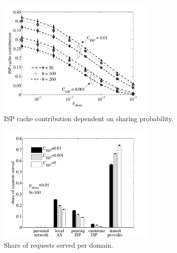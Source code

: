 \begin{figure}[tb]
  \centering
  \includegraphics[width=0.7\textwidth]{hierarchical/simulative/figures/ISPcontrib}
  \caption{ISP cache contribution dependent on sharing probability.}
  \label{fig:ISPcontrib}
\end{figure}

\begin{figure}[tb]
  \centering
  \includegraphics[width=0.7\textwidth]{hierarchical/simulative/figures/RBHall}
  \caption{Share of requests served per domain.}
  \label{fig:RBHall}
\end{figure}


